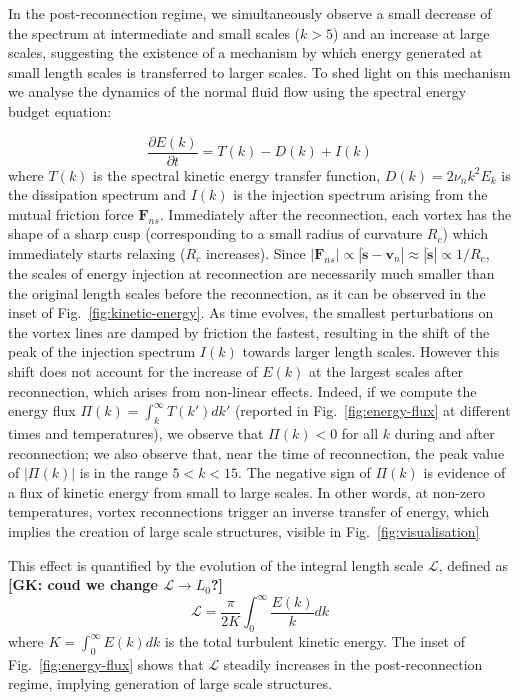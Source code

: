 \documentclass[%
 reprint,
 amsmath,amssymb,
 aps,
 prl,
]{revtex4-2}
\def \s{\mathbf{s}}
\def \v{\mathbf{v}}
\def \k{\mathbf{k}}
\newcommand*{\NOTE}[1]{\textbf{\color{red}[#1]}}
\begin{document}
{In the post-reconnection regime, we simultaneously observe a small 
decrease of the spectrum at intermediate 
and small scales ($k > 5$) and an increase at large scales, 
suggesting the existence of a mechanism by 
which energy generated at small length scales is transferred to larger scales. 
To shed light on this mechanism
we analyse the dynamics of the normal fluid flow using the 
spectral energy budget equation: 

\begin{equation}
    \frac{\partial E(k)}{\partial t} = T(k) - D(k) + I(k)
\end{equation}
where $T(k)$ is the spectral kinetic energy transfer function,
$D(k)=2\nu_n k^2 E_k$ is the dissipation spectrum and
$I(k)$ is the injection spectrum arising from the mutual friction 
force $\mathbf{F}_{ns}$. 
Immediately after the reconnection, each vortex has the shape of
a sharp cusp (corresponding to a small radius of curvature $R_c$)
which immediately starts relaxing ($R_c$ increases). Since
$|\mathbf{F}_{ns}| \propto  |\dot{\s}-\v_n| \approx |\dot{\s}| \propto 1/R_c$, 
the scales of energy injection at reconnection are necessarily
much smaller than the original length scales before the reconnection, 
as it can be observed in the inset of Fig.~\ref{fig:kinetic-energy}. 
As time evolves, the smallest perturbations on the vortex lines are damped 
by friction the fastest, resulting in the shift of 
the peak of the injection spectrum $I(k)$ towards larger length scales. 
However this shift does not account 
for the increase of $E(k)$ at the largest scales after reconnection, 
which arises from non-linear effects.
Indeed, if we compute the energy flux 
$\displaystyle \Pi(k) = \int_{k}^{\infty}T(k') dk'$ 
(reported in Fig.~\ref{fig:energy-flux} at different times and temperatures), 
we observe that $\Pi(k) < 0$ for all $k$ during and after reconnection;
we also observe that, near the time of reconnection,
the peak value of $|\Pi(k)|$ is in the range $5 < k < 15$.
The negative sign of $\Pi(k)$ is evidence of a flux of kinetic 
energy from small to large scales. In other words, at non-zero temperatures,
vortex reconnections trigger an inverse transfer of energy, 
which implies the creation of large scale structures, visible
in Fig.~\ref{fig:visualisation}} 
This effect is quantified by
the evolution of the integral length scale $\mathcal{L}$, 
defined as \NOTE{GK: coud we change $\mathcal{L}\to L_0$?}
\begin{equation}
    \mathcal{L} = \frac{\pi}{2 K}\int_0^{\infty}\frac{E(k)}{k}dk
\end{equation}
where $K=\int_0^{\infty}\!\!E(k)dk$ is the total turbulent kinetic
energy. The inset of Fig.~\ref{fig:energy-flux} shows that
$\mathcal{L}$ steadily increases in the post-reconnection regime,
implying generation of large scale structures. 
\end{document}
